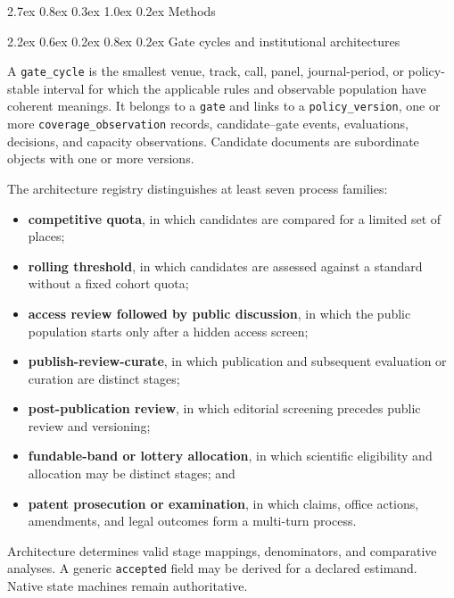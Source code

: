 \documentclass[
  10pt,
]{article}
\makeatletter
\providecommand{\tightlist}{%
  \setlength{\itemsep}{0pt}\setlength{\parskip}{0pt}}
\renewcommand\section{\@startsection{section}{1}{\z@}%
  {2.7ex \@plus 0.8ex \@minus 0.3ex}%
  {1.0ex \@plus 0.2ex}%
  {\normalfont\Large\sffamily\bfseries\color{OSGInk}}}
\renewcommand\subsection{\@startsection{subsection}{2}{\z@}%
  {2.2ex \@plus 0.6ex \@minus 0.2ex}%
  {0.8ex \@plus 0.2ex}%
  {\normalfont\large\sffamily\bfseries\color{OSGInk}}}
\makeatother
\begin{document}
\section{Methods}\label{methods}

\subsection{Gate cycles and institutional
architectures}\label{21-gate-cycles-and-institutional-architectures}

A \texttt{gate\_cycle} is the smallest venue, track, call, panel,
journal-period, or policy-stable interval for which the applicable rules
and observable population have coherent meanings. It belongs to a
\texttt{gate} and links to a \texttt{policy\_version}, one or more
\texttt{coverage\_observation} records, candidate--gate events,
evaluations, decisions, and capacity observations. Candidate documents
are subordinate objects with one or more versions.

The architecture registry distinguishes at least seven process families:

\begin{itemize}
\tightlist
\item
  \textbf{competitive quota}, in which candidates are compared for a
  limited set of places;
\item
  \textbf{rolling threshold}, in which candidates are assessed against a
  standard without a fixed cohort quota;
\item
  \textbf{access review followed by public discussion}, in which the
  public population starts only after a hidden access screen;
\item
  \textbf{publish-review-curate}, in which publication and subsequent
  evaluation or curation are distinct stages;
\item
  \textbf{post-publication review}, in which editorial screening
  precedes public review and versioning;
\item
  \textbf{fundable-band or lottery allocation}, in which scientific
  eligibility and allocation may be distinct stages; and
\item
  \textbf{patent prosecution or examination}, in which claims, office
  actions, amendments, and legal outcomes form a multi-turn process.
\end{itemize}

Architecture determines valid stage mappings, denominators, and
comparative analyses. A generic \texttt{accepted} field may be derived
for a declared estimand. Native state machines remain authoritative.
\end{document}
